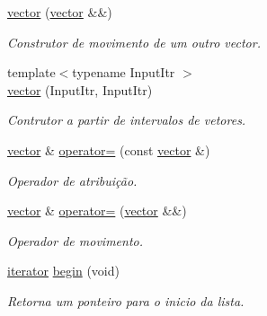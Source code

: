 \begin{DoxyCompactItemize}
\mbox{\label{classsc_1_1vector_a63a0f6f3a31120e3e3f269553d0fa82d}} 
\hyperlink{classsc_1_1vector_a63a0f6f3a31120e3e3f269553d0fa82d}{vector} (\hyperlink{classsc_1_1vector}{vector} \&\&)
\begin{DoxyCompactList}\small\item\em Construtor de movimento de um outro vector. \end{DoxyCompactList}\item 
\mbox{\label{classsc_1_1vector_af271ce749db30ebfaf317330e5b1de8c}} 
{\footnotesize template$<$typename Input\+Itr $>$ }\\\hyperlink{classsc_1_1vector_af271ce749db30ebfaf317330e5b1de8c}{vector} (Input\+Itr, Input\+Itr)
\begin{DoxyCompactList}\small\item\em Contrutor a partir de intervalos de vetores. \end{DoxyCompactList}\item 
\mbox{\label{classsc_1_1vector_aa39c1f22582a429142479349a40cbbb7}} 
\hyperlink{classsc_1_1vector}{vector} \& \hyperlink{classsc_1_1vector_aa39c1f22582a429142479349a40cbbb7}{operator=} (const \hyperlink{classsc_1_1vector}{vector} \&)
\begin{DoxyCompactList}\small\item\em Operador de atribuição. \end{DoxyCompactList}\item 
\mbox{\label{classsc_1_1vector_a8d6fa43cf97edad41fe82e4c91b3d064}} 
\hyperlink{classsc_1_1vector}{vector} \& \hyperlink{classsc_1_1vector_a8d6fa43cf97edad41fe82e4c91b3d064}{operator=} (\hyperlink{classsc_1_1vector}{vector} \&\&)
\begin{DoxyCompactList}\small\item\em Operador de movimento. \end{DoxyCompactList}\item 
\mbox{\label{classsc_1_1vector_ae198130cd01e8d5a4df07d6567b51eb4}} 
\hyperlink{classsc_1_1vector_a9e5d5cc35e379aa27a93989f4a71413c}{iterator} \hyperlink{classsc_1_1vector_ae198130cd01e8d5a4df07d6567b51eb4}{begin} (void)
\begin{DoxyCompactList}\small\item\em Retorna um ponteiro para o inicio da lista. \end{DoxyCompactList}\item 

\end{DoxyCompactItemize}

